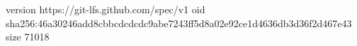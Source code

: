 version https://git-lfs.github.com/spec/v1
oid sha256:46a30246add8cbbcdcdcdc9abe7243ff5d8a02e92ce1d4636db3d36f2d467e43
size 71018
